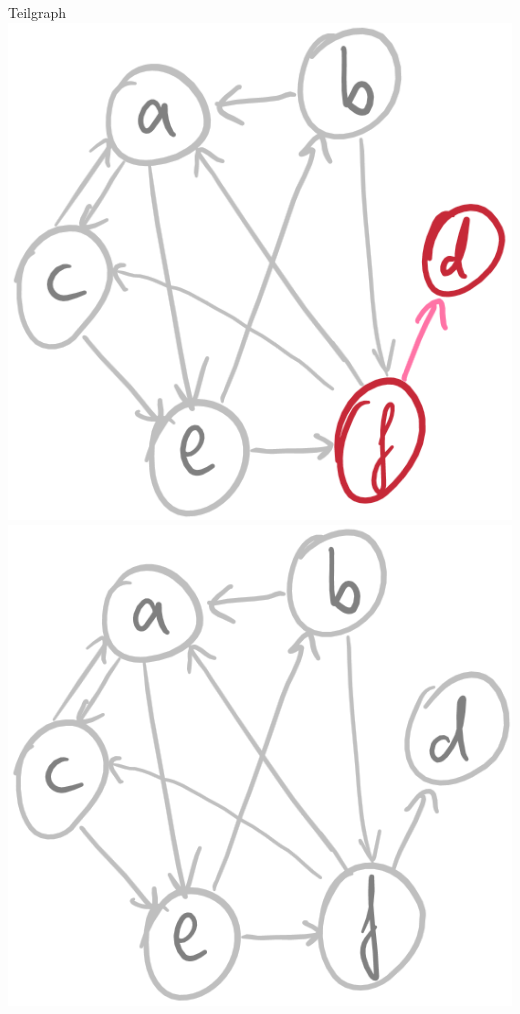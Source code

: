 \documentclass[handout]{beamer}
\begin{document}
\begin{frame}{Teilgraph}
	\includegraphics[scale=0.2]{images/graph_teilgraph_03.png}\ip
	\includegraphics[scale=0.2]{images/graph_teilgraph_01.png} %
\end{frame}
\end{document}
